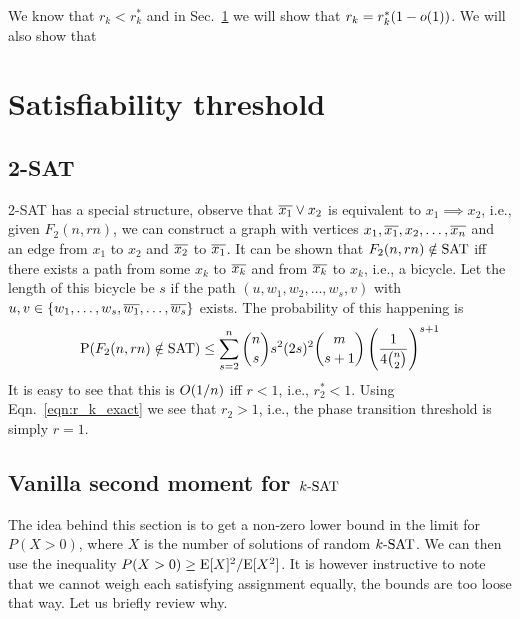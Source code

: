 \documentclass[letterpaper, 10pt, twocolumn, reqno]{amsart}
\begin{document}
We know that $r_k < r_k^*$ and in Sec.~\ref{sec:sat_thresh}
 we will show that $r_k = r_k^*(1-o(1))$. We will also show that

\section{Satisfiability threshold}
\label{sec:sat_thresh}


\subsection{2-SAT}
\label{ssec:2sat}
2-SAT has a special structure, observe that $\overline{x_1} \vee x_2$ is equivalent to $x_1 \implies x_2$, i.e., given $F_2(n, rn)$, we can construct a graph with
vertices $x_1, \overline{x_1}, x_2, \ldots, \overline{x_n}$ and an edge from $x_1$ to $x_2$ and $\overline{x_2}$ to $\overline{x_1}$. It can be shown that $F_2(n,rn) \notin \textrm{SAT}$ iff
there exists a path from some $x_k$ to $\overline{x_k}$ and from $\overline{x_k}$ to $x_k$, i.e., a bicycle. Let the length of this bicycle be $s$ if the path $(u, w_1, w_2
, \ldots, w_s, v)$ with $u,v \in \{w_1, \ldots, w_s,\overline{w_1}, \ldots, \overline{w_s}\}$
 exists. The probability of this happening is
$$
\textrm{P}(F_2(n,rn) \notin \textrm{SAT}) \leq \sum_{s=2}^n {n \choose s} s^2 (2s)^2 {m \choose s+1} \left(\frac{1}{4 {n \choose 2}}\right)^{s+1}
$$
It is easy to see that this is $O(1/n)$ iff $r <1$, i.e., $r_2^* < 1$. Using Eqn.~\eqref{eqn:r_k_exact} we see that $r_2 > 1$, i.e., the phase transition threshold is simply $r = 1$.

\subsection{Vanilla second moment for $k\textrm{-SAT}$}
\label{ssec:ksat_vanilla}
The idea behind this section is to get a non-zero lower bound in the limit for $P(X > 0)$, where $X$ is the number of solutions of random $k\textrm{-SAT}$. We can then use the inequality $P(X>0) \geq \textrm{E}[X]^2/\textrm{E}[X^2]$. It is however instructive to note that we cannot weigh each satisfying assignment equally, the bounds are too loose that way. Let us briefly review why.
\end{document}
